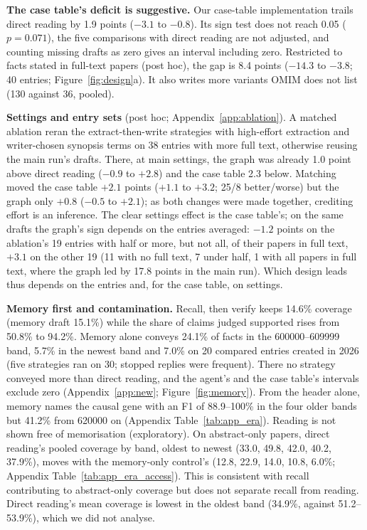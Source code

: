 \documentclass{article} %
\begin{document}
\textbf{The case table's deficit is suggestive.} Our case-table implementation trails direct reading by 1.9 points ($-3.1$ to $-0.8$). Its sign test does not reach 0.05 ($p=0.071$), the five comparisons with direct reading are not adjusted, and counting missing drafts as zero gives an interval including zero. Restricted to facts stated in full-text papers (post hoc), the gap is 8.4 points ($-14.3$ to $-3.8$; 40 entries; Figure~\ref{fig:design}a). It also writes more variants OMIM does not list (130 against 36, pooled).

\textbf{Settings and entry sets} (post hoc; Appendix~\ref{app:ablation}). A matched ablation reran the extract-then-write strategies with high-effort extraction and writer-chosen synopsis terms on 38 entries with more full text, otherwise reusing the main run's drafts. There, at main settings, the graph was already 1.0 point above direct reading ($-0.9$ to $+2.8$) and the case table 2.3 below. Matching moved the case table $+2.1$ points ($+1.1$ to $+3.2$; 25/8 better/worse) but the graph only $+0.8$ ($-0.5$ to $+2.1$); as both changes were made together, crediting effort is an inference. The clear settings effect is the case table's; on the same drafts the graph's sign depends on the entries averaged: $-1.2$ points on the ablation's 19 entries with half or more, but not all, of their papers in full text, $+3.1$ on the other 19 (11 with no full text, 7 under half, 1 with all papers in full text, where the graph led by 17.8 points in the main run). Which design leads thus depends on the entries and, for the case table, on settings.

\textbf{Memory first and contamination.} Recall, then verify keeps 14.6\% coverage (memory draft 15.1\%) while the share of claims judged supported rises from 50.8\% to 94.2\%. Memory alone conveys 24.1\% of facts in the 600000--609999 band, 5.7\% in the newest band and 7.0\% on 20 compared entries created in 2026 (five strategies ran on 30; stopped replies were frequent). There no strategy conveyed more than direct reading, and the agent's and the case table's intervals exclude zero (Appendix~\ref{app:new}; Figure~\ref{fig:memory}). From the header alone, memory names the causal gene with an F1 of 88.9--100\% in the four older bands but 41.2\% from 620000 on (Appendix Table~\ref{tab:app_era}). Reading is not shown free of memorisation (exploratory). On abstract-only papers, direct reading's pooled coverage by band, oldest to newest (33.0, 49.8, 42.0, 40.2, 37.9\%), moves with the memory-only control's (12.8, 22.9, 14.0, 10.8, 6.0\%; Appendix Table~\ref{tab:app_era_access}). This is consistent with recall contributing to abstract-only coverage but does not separate recall from reading. Direct reading's mean coverage is lowest in the oldest band (34.9\%, against 51.2--53.9\%), which we did not analyse.
\end{document}
